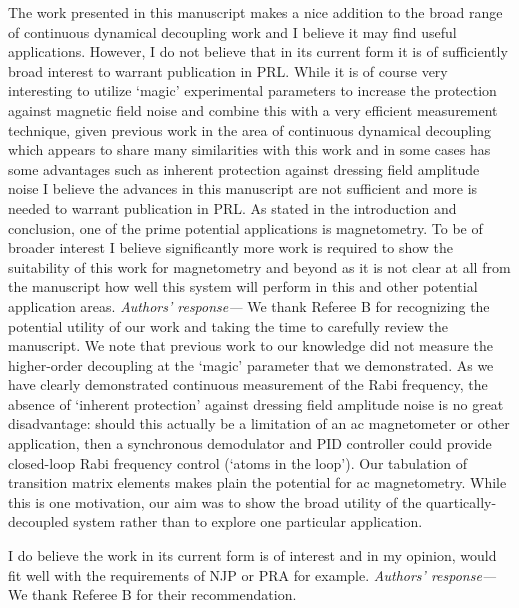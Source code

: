 \documentclass[letterpaper]{article}
\newenvironment{refcomment}{\singlespacing\verbatim}{\endverbatim}
\newcommand{\response}{\emph{Authors' response---}}
\begin{document}
\begin{refcomment}
The work presented in this manuscript makes a nice addition to the 
broad range of continuous dynamical decoupling work and I believe it 
may find useful applications. However, I do not believe that in its 
current form it is of sufficiently broad interest to warrant 
publication in PRL. While it is of course very interesting to utilize 
‘magic’ experimental parameters to increase the protection against
magnetic field noise and combine this with a very efficient 
measurement technique, given previous work in the area of continuous 
dynamical decoupling which appears to share many similarities with
this work and in some cases has some advantages such as inherent 
protection against dressing field amplitude noise I believe the 
advances in this manuscript are not sufficient and more is needed to
warrant publication in PRL. As stated in the introduction and 
conclusion, one of the prime potential applications is magnetometry. 
To be of broader interest I believe significantly more work is 
required to show the suitability of this work for magnetometry and 
beyond as it is not clear at all from the manuscript how well this 
system will perform in this and other potential application areas.
\end{refcomment}
\newpage
\response 
We thank Referee B for recognizing the potential utility of our work and taking the time to carefully review the manuscript.
We note that previous work to our knowledge did not measure the higher-order decoupling at the `magic' parameter that we demonstrated.
As we have clearly demonstrated continuous measurement of the Rabi frequency, the absence of `inherent protection' against dressing field amplitude noise is no great disadvantage: should this actually be a limitation of an ac magnetometer or other application, then a synchronous demodulator and PID controller could provide closed-loop Rabi frequency control (`atoms in the loop').  
Our tabulation of transition matrix elements makes plain the potential for ac magnetometry.
While this is one motivation, our aim was to show the broad utility of the quartically-decoupled system rather than to explore one particular application. 

\begin{refcomment}
I do believe the work in its current form is of interest and in my 
opinion, would fit well with the requirements of NJP or PRA for 
example.
\end{refcomment}
\response We thank Referee B for their recommendation.
\end{document}
